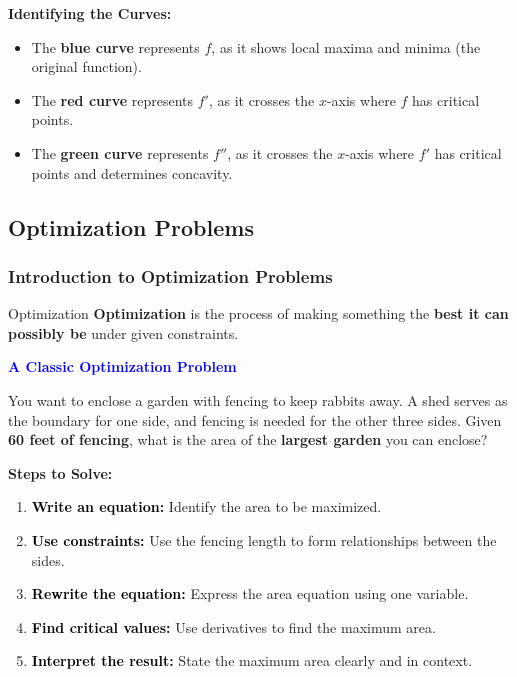 \documentclass[12pt]{article}
\theoremstyle{beautifulthm}
\begin{document}
\begin{tcolorbox}[colback=examplebg, colframe=red!75!black, title=\textbf{EXAMPLE 1: Determine Which is Which}, fonttitle=\bfseries, sharp corners]
\noindent\textbf{Identifying the Curves:}
\begin{itemize}
    \item The \textbf{blue curve} represents \( f \), as it shows local maxima and minima (the original function).
    \item The \textbf{red curve} represents \( f' \), as it crosses the \( x \)-axis where \( f \) has critical points.
    \item The \textbf{green curve} represents \( f'' \), as it crosses the \( x \)-axis where \( f' \) has critical points and determines concavity.
\end{itemize}




\end{tcolorbox}

\subsection{Optimization Problems}
\subsubsection{Introduction to Optimization Problems}
\begin{Definition}{Optimization }
\textbf{Optimization} is the process of making something the \textbf{best it can possibly be} under given constraints.
\end{Definition}

\vspace{5mm}

\noindent\textbf{\textcolor{blue}{A Classic Optimization Problem}}

\noindent You want to enclose a garden with fencing to keep rabbits away. A shed serves as the boundary for one side, and fencing is needed for the other three sides. Given \textbf{60 feet of fencing}, what is the area of the \textbf{largest garden} you can enclose?

\vspace{3mm}

\noindent\textbf{\textcolor{green!50!black}{Steps to Solve:}}

\begin{enumerate}
    \item \textbf{\textcolor{black}{Write an equation:}} Identify the area to be maximized.
    \item \textbf{\textcolor{black}{Use constraints:}} Use the fencing length to form relationships between the sides.
    \item \textbf{\textcolor{black}{Rewrite the equation:}} Express the area equation using one variable.
    \item \textbf{\textcolor{black}{Find critical values:}} Use derivatives to find the maximum area.
    \item \textbf{\textcolor{black}{Interpret the result:}} State the maximum area clearly and in context.
\end{enumerate}
\end{document}
